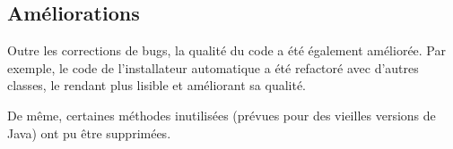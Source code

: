\subsection{Améliorations}
Outre les corrections de bugs, la qualité du code a été également améliorée.
Par exemple, le code de l'installateur automatique a été refactoré avec d'autres classes, le rendant plus lisible et améliorant sa qualité.

De même, certaines méthodes inutilisées (prévues pour des vieilles versions de Java) ont pu être supprimées.